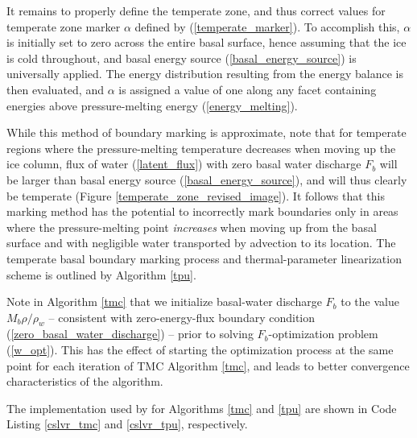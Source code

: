 It remains to properly define the temperate zone, and thus correct values for temperate zone marker $\alpha$ defined by (\ref{temperate_marker}).  To accomplish this, $\alpha$ is initially set to zero across the entire basal surface, hence assuming that the ice is cold throughout, and basal energy source (\ref{basal_energy_source}) is universally applied.  The energy distribution resulting from the energy balance is then evaluated, and $\alpha$ is assigned a value of one along any facet containing energies above pressure-melting energy (\ref{energy_melting}).

While this method of boundary marking is approximate, note that for temperate regions where the pressure-melting temperature decreases when moving up the ice column, flux of water (\ref{latent_flux}) with zero basal water discharge $F_b$ will be larger than basal energy source (\ref{basal_energy_source}), and will thus clearly be temperate (Figure \ref{temperate_zone_revised_image}).  It follows that this marking method has the potential to incorrectly mark boundaries only in areas where the pressure-melting point \emph{increases} when moving up from the basal surface and with negligible water transported by advection to its location.  The temperate basal boundary marking process and thermal-parameter linearization scheme is outlined by Algorithm \ref{tpu}.

Note in Algorithm \ref{tmc} that we initialize basal-water discharge $F_b$ to the value $M_b \rho / \rho_w$ -- consistent with zero-energy-flux boundary condition (\ref{zero_basal_water_discharge}) -- prior to solving $F_b$-optimization problem (\ref{w_opt}).  This has the effect of starting the optimization process at the same point for each iteration of TMC Algorithm \ref{tmc}, and leads to better convergence characteristics of the algorithm.

The implementation used by \CSLVR for Algorithms \ref{tmc} and \ref{tpu} are shown in Code Listing \ref{cslvr_tmc} and \ref{cslvr_tpu}, respectively.

